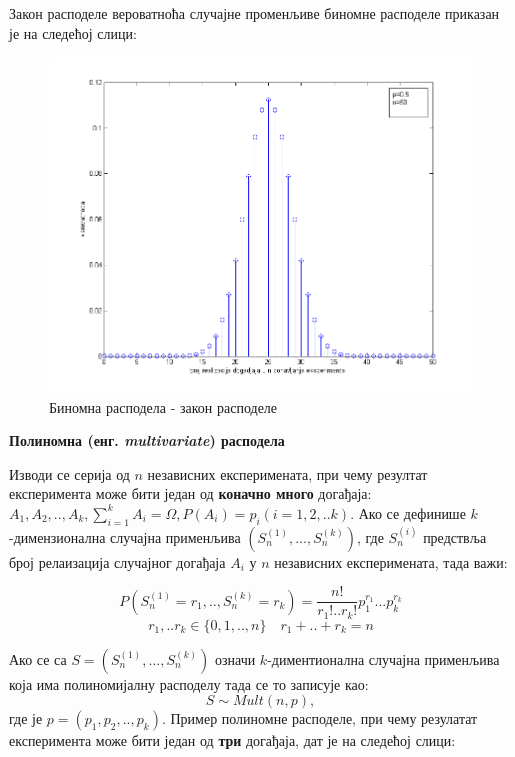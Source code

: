 Закон расподеле вероватноћа случајне променљиве биномне расподеле приказан је на следећој слици:


\begin{figure}[H]
    \centering
\captionsetup{justification=centering}
   \includegraphics[scale=0.5]{./Slike/slika28.png} 
	\caption{Биномна расподела - закон расподеле} 
	\label{fig:slika20}
\end{figure}

\textbf{Полиномна (енг. \textit{multivariate}) расподела}

Изводи се серија од $n$ независних експеримената, при чему резултат експеримента може бити један од \textbf{коначно много} догађаја: $ A_1,A_2,..,A_k, \sum_{i=1}^k A_i = \Omega, P(A_i)=p_i (i=1,2,..k)$. 
Ако се дефинише $k$-димензионална случајна применљива $(S_n^{(1)},...,S_n^{(k)})$, где $S_n^{(i)}$ предствља број релаизација случајног догађаја $A_i$ у $n$ независних експеримената, тада важи:

$$
P(S_n^{(1)}=r_1,..,S_n^{(k)}=r_k) = \frac{n!}{r_1!..r_k!}p_1^{r_1}...p_k^{r_k} $$
$$
r_1,..r_k \in \lbrace 0,1,..,n \rbrace \quad
r_1+..+r_k = n
$$

Ако се са $S = (S_n^{(1)},...,S_n^{(k)})$ означи $k$-диментионална случајна применљива која има полиномијалну расподелу тада се то записује као:
$$
S \sim Mult(n,p),
$$
где је $p = (p_1,p_2,..,p_k)$. Пример полиномне расподеле, при чему резулатат експеримента може бити један од \textbf{три} догађаја, дат је на следећој слици:


